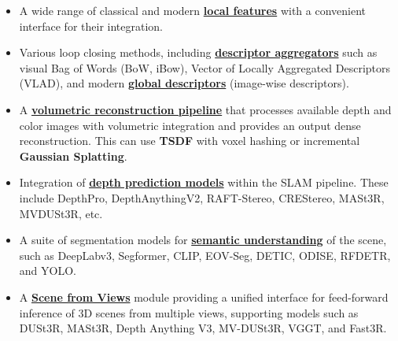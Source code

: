 \documentclass{article}
\begin{document}
\begin{itemize}
    \item A wide range of classical and modern
    \textbf{\protect\hyperlink{supported-local-features}{local features}}
    with a convenient interface for their integration. 
    
    \item Various loop closing methods, including
    \textbf{\protect\hyperlink{supported-global-descriptors-and-local-descriptor-aggregation-methods}{descriptor
    aggregators}} such as visual Bag of Words (BoW\cite{galvez2012bags}, iBow\cite{garcia2018ibow}), Vector of Locally
    Aggregated Descriptors (VLAD\cite{jegou2010aggregating}), and modern
    \textbf{\protect\hyperlink{supported-global-descriptors-and-local-descriptor-aggregation-methods}{global
    descriptors}} (image-wise descriptors).
    
    \item A
    \textbf{\protect\hyperlink{volumetric-reconstruction}{volumetric
    reconstruction pipeline}} that processes available depth and color
    images with volumetric integration and provides an output dense
    reconstruction. This can use \textbf{TSDF}\cite{dong2022ash} with voxel hashing or
    incremental \textbf{Gaussian Splatting}\cite{matsuki2023gaussian,kerbl20233d}.
    
    \item Integration of
    \textbf{\protect\hyperlink{depth-prediction}{depth prediction models}}
    within the SLAM pipeline. These include DepthPro\cite{depthpro2023}, DepthAnythingV2\cite{depthanythingv2_2024},
    RAFT-Stereo\cite{teed2021raft}, CREStereo\cite{li2022cres}, MASt3R\cite{master}, MVDUSt3R\cite{mvduster}, etc.

    \item A suite of segmentation models for
    \textbf{\protect\hyperlink{semantic-mapping}{semantic understanding}} of
    the scene, such as DeepLabv3\cite{chen2017rethinking}, Segformer\cite{xie2021segformer}, CLIP\cite{lin2023clip}, EOV-Seg\cite{eov_seg}, DETIC\cite{detic}, ODISE\cite{odise}, RFDETR\cite{rfdetr}, and YOLO\cite{redmon2016yolo,redmon2017yolo9000,redmon2018yolov3,bochkovskiy2020yolov4,jocher2020yolov5, wang2022yolov7, jocher2023yolov8, sapkota2025ultralytics}.
    
    \item A \textbf{\protect\hyperlink{scene-from-views}{Scene from Views}} module providing a unified interface for feed-forward inference of 3D scenes from multiple views, supporting models such as DUSt3R\cite{wang2023dust3r}, MASt3R\cite{leroy2024grounding}, Depth Anything V3\cite{depthanything3}, MV-DUSt3R\cite{tang2025mv}, VGGT\cite{wang2025vggt}, and Fast3R\cite{yang2025fast3r}.
    

\end{itemize}
\end{document}
